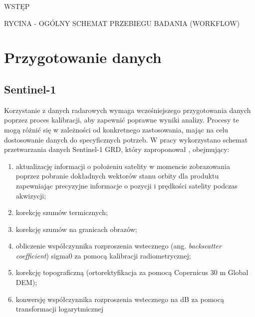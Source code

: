 \documentclass{amuthesis}
\begin{document}
WSTĘP

RYCINA - OGÓLNY SCHEMAT PRZEBIEGU BADANIA (WORKFLOW)

\hypertarget{sec-processing}{%
\section{Przygotowanie danych}\label{sec-processing}}

\hypertarget{sec-processing-s1}{%
\subsection{Sentinel-1}\label{sec-processing-s1}}

Korzystanie z danych radarowych wymaga wcześniejszego przygotowania
danych poprzez proces kalibracji, aby zapewnić poprawne wyniki analizy.
Procesy te mogą różnić się w zależności od konkretnego zastosowania,
mając na celu dostosowanie danych do specyficznych potrzeb. W pracy
wykorzystano schemat przetwarzania danych Sentinel-1 GRD, który
zaproponował \textcite{filipponi_2019_s1_workflow}, obejmujący:

\begin{enumerate}
\def\labelenumi{\arabic{enumi}.}
\item
  aktualizację informacji o położeniu satelity w momencie zobrazowania
  poprzez pobranie dokładnych wektorów stanu orbity dla produktu
  zapewniając precyzyjne informacje o pozycji i prędkości satelity
  podczas akwizycji;
\item
  korekcję szumów termicznych;
\item
  korekcję szumów na granicach obrazów;
\item
  obliczenie współczynnika rozproszenia wstecznego (ang.
  \emph{backscatter coefficient}) sigma0 za pomocą kalibracji
  radiometrycznej;
\item
  korekcję topograficzną (ortorektyfikacja za pomocą Copernicus 30 m
  Global DEM);
\item
  konwersję współczynnika rozproszenia wstecznego na dB za pomocą
  transformacji logarytmicznej
\end{enumerate}
\end{document}
